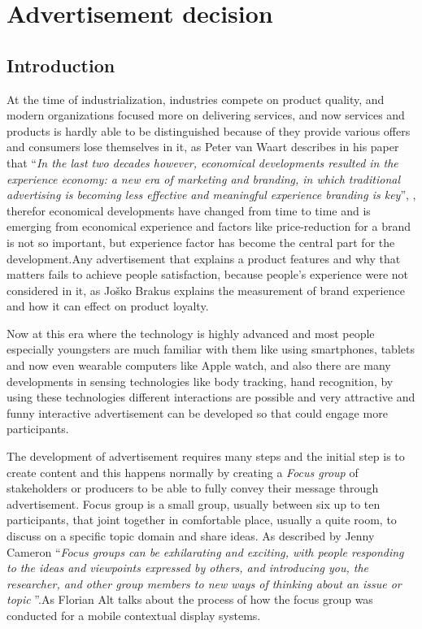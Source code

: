 \chapter{Advertisement decision} %

\label{Chapter4} %
\newpage



\section{Introduction}

At the time of industrialization, industries compete on product quality, and modern organizations focused more on delivering services, and now services and products is hardly able to be distinguished because of they provide various offers and consumers lose themselves in it, as Peter van Waart describes in his paper that ``\emph{In the last two decades however, economical developments resulted in the experience economy: a new era of marketing and branding, in which traditional advertising is becoming less effective and meaningful experience branding is key}'', \cite{Meaningful_ad}, therefor economical developments have changed from time to time and is emerging from economical experience and factors like price-reduction for a brand is not so important, but experience factor has become the central part for the development.Any advertisement that explains a product features and why that matters fails to achieve people satisfaction, because people’s experience were not considered in it, as Joško Brakus \cite{Brand_experience} explains the measurement of brand experience and how it can effect on product loyalty.

Now at this era where the technology is highly advanced and most people especially youngsters are much familiar with them like using smartphones, tablets and now even wearable computers like Apple watch, and also there are many developments in sensing technologies like body tracking, hand recognition, by using these technologies different interactions are possible and very attractive and funny interactive advertisement can be developed so that could engage more participants.

The development of advertisement requires many steps and the initial step is to create content and this happens normally by creating a \emph{Focus group} of stakeholders or producers to be able to fully convey their message through advertisement. Focus group is a small group, usually between six up to ten participants, that joint together in comfortable place, usually a quite room, to discuss on a specific topic domain and share ideas. As described by Jenny Cameron ``\emph{Focus groups can be exhilarating and exciting, with people responding to the ideas and viewpoints expressed by others, and introducing you, the researcher, and other group members to new ways of thinking about an issue or topic }''\cite{FocusGroup}.As Florian Alt \cite{mobile_focus_group} talks about the process of how the focus group was conducted for a mobile contextual display systems.

